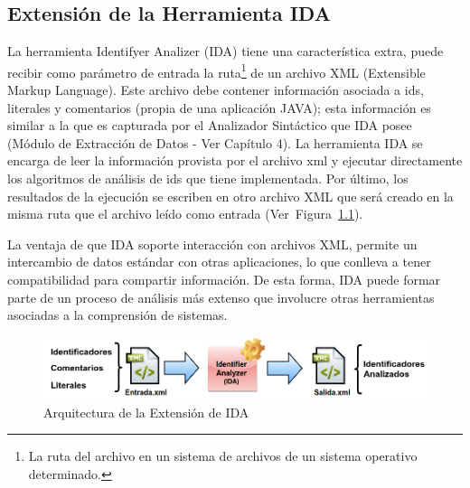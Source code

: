 \begin{appendices}

\chapter{}

\enlargethispage{\baselineskip}
\section{Extensión de la Herramienta IDA}

La herramienta Identifyer Analizer (IDA) tiene una característica extra, puede recibir como parámetro de entrada la ruta\footnote[1]{La ruta del archivo en un sistema de archivos de un sistema operativo determinado.} de un archivo XML (Extensible Markup Language). Este archivo debe contener información asociada a ids, literales y comentarios (propia de una aplicación JAVA); esta información es similar a la que es capturada por el Analizador Sintáctico que IDA posee (Módulo de Extracción de Datos - Ver Capítulo 4).
La herramienta IDA se encarga de leer la información provista por el archivo xml y ejecutar directamente los algoritmos de análisis de ids que tiene implementada. Por último, los resultados de la ejecución se escriben en otro archivo XML que será creado en la misma ruta que el archivo leído como entrada \mbox{(Ver Figura \ref{arq1}).}

La ventaja de que IDA soporte interacción con archivos XML, permite un intercambio de datos estándar con otras aplicaciones, lo que conlleva a tener compatibilidad para compartir información. De esta forma, IDA puede formar parte de un proceso de análisis más extenso que involucre otras herramientas asociadas a la comprensión de sistemas.

\vspace{-0.5em}

\begin{figure}[h!] %
\centerline{%
\includegraphics[scale= 0.57]{./ape/ape_01.png}
}
\caption{Arquitectura de la Extensión de IDA}
\label{arq1}
\end{figure}



\end{appendices}
